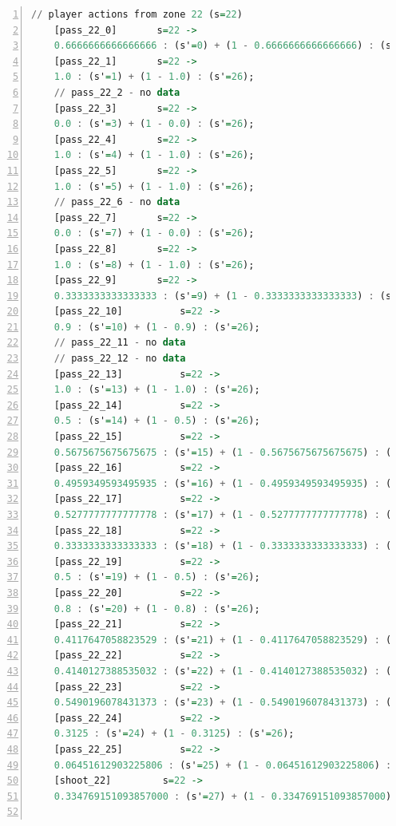 \documentclass{l4proj}
\begin{document}
\begin{appendices}
\begin{lstlisting}[language=Haskell, numbers=left, caption=MDP used for strategy generation. This is the model specification as-is after the refinements at the end of chapter 3.]
	// player actions from zone 22 (s=22)
	[pass_22_0]	      s=22 ->
	0.6666666666666666 : (s'=0) + (1 - 0.6666666666666666) : (s'=26);
	[pass_22_1]	      s=22 ->
	1.0 : (s'=1) + (1 - 1.0) : (s'=26);
	// pass_22_2 - no data
	[pass_22_3]	      s=22 ->
	0.0 : (s'=3) + (1 - 0.0) : (s'=26);
	[pass_22_4]	      s=22 ->
	1.0 : (s'=4) + (1 - 1.0) : (s'=26);
	[pass_22_5]	      s=22 ->
	1.0 : (s'=5) + (1 - 1.0) : (s'=26);
	// pass_22_6 - no data
	[pass_22_7]	      s=22 ->
	0.0 : (s'=7) + (1 - 0.0) : (s'=26);
	[pass_22_8]	      s=22 ->
	1.0 : (s'=8) + (1 - 1.0) : (s'=26);
	[pass_22_9]	      s=22 ->
	0.3333333333333333 : (s'=9) + (1 - 0.3333333333333333) : (s'=26);
	[pass_22_10]	      s=22 ->
	0.9 : (s'=10) + (1 - 0.9) : (s'=26);
	// pass_22_11 - no data
	// pass_22_12 - no data
	[pass_22_13]	      s=22 ->
	1.0 : (s'=13) + (1 - 1.0) : (s'=26);
	[pass_22_14]	      s=22 ->
	0.5 : (s'=14) + (1 - 0.5) : (s'=26);
	[pass_22_15]	      s=22 ->
	0.5675675675675675 : (s'=15) + (1 - 0.5675675675675675) : (s'=26);
	[pass_22_16]	      s=22 ->
	0.4959349593495935 : (s'=16) + (1 - 0.4959349593495935) : (s'=26);
	[pass_22_17]	      s=22 ->
	0.5277777777777778 : (s'=17) + (1 - 0.5277777777777778) : (s'=26);
	[pass_22_18]	      s=22 ->
	0.3333333333333333 : (s'=18) + (1 - 0.3333333333333333) : (s'=26);
	[pass_22_19]	      s=22 ->
	0.5 : (s'=19) + (1 - 0.5) : (s'=26);
	[pass_22_20]	      s=22 ->
	0.8 : (s'=20) + (1 - 0.8) : (s'=26);
	[pass_22_21]	      s=22 ->
	0.4117647058823529 : (s'=21) + (1 - 0.4117647058823529) : (s'=26);
	[pass_22_22]	      s=22 ->
	0.4140127388535032 : (s'=22) + (1 - 0.4140127388535032) : (s'=26);
	[pass_22_23]	      s=22 ->
	0.5490196078431373 : (s'=23) + (1 - 0.5490196078431373) : (s'=26);
	[pass_22_24]	      s=22 ->
	0.3125 : (s'=24) + (1 - 0.3125) : (s'=26);
	[pass_22_25]	      s=22 ->
	0.06451612903225806 : (s'=25) + (1 - 0.06451612903225806) : (s'=26);
	[shoot_22]	       s=22 ->
	0.334769151093857000 : (s'=27) + (1 - 0.334769151093857000) : (s'=26);


\end{lstlisting}
\end{appendices}
\end{document}
